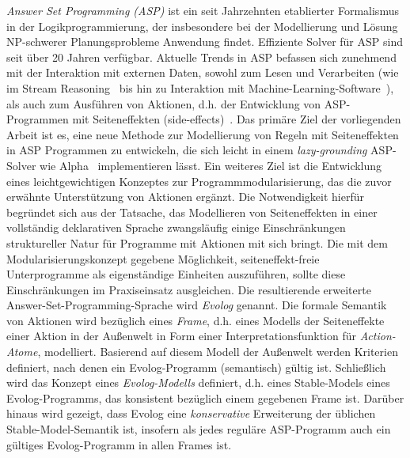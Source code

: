 \documentclass[draft,final]{vutinfth} %
\theoremstyle{definition}
\begin{document}
\frontmatter %

\addstatementpage

\begin{danksagung*}
\end{danksagung*}

\begin{acknowledgements*}
\end{acknowledgements*}

\begin{kurzfassung}
  \emph{Answer Set Programming (ASP)} ist ein seit Jahrzehnten etablierter Formalismus in der Logikprogrammierung, der insbesondere bei der Modellierung und Lösung NP-schwerer Planungsprobleme Anwendung findet. Effiziente Solver für ASP sind seit über 20 Jahren verfügbar. Aktuelle Trends in ASP befassen sich zunehmend mit der Interaktion mit externen Daten, sowohl zum Lesen und Verarbeiten (wie im Stream Reasoning~\cite{lars} bis hin zu Interaktion mit Machine-Learning-Software~\cite{neurasp}), als auch zum Ausführen von Aktionen, d.h. der Entwicklung von ASP-Programmen mit Seiteneffekten (side-effects)~\cite{acthex, aspetris}. Das primäre Ziel der vorliegenden Arbeit ist es, eine neue Methode zur Modellierung von Regeln mit Seiteneffekten in ASP Programmen zu entwickeln, die sich leicht in einem \emph{lazy-grounding} ASP-Solver wie Alpha~\cite{alpha} implementieren lässt. Ein weiteres Ziel ist die Entwicklung eines leichtgewichtigen Konzeptes zur Programmmodularisierung, das die zuvor erwähnte Unterstützung von Aktionen ergänzt. Die Notwendigkeit hierfür begründet sich aus der Tatsache, das Modellieren von Seiteneffekten in einer vollständig deklarativen Sprache zwangsläufig einige Einschränkungen struktureller Natur für Programme mit Aktionen mit sich bringt. Die mit dem Modularisierungskonzept gegebene Möglichkeit, seiteneffekt-freie Unterprogramme als eigenständige Einheiten auszuführen, sollte diese Einschränkungen im Praxiseinsatz ausgleichen. Die resultierende erweiterte Answer-Set-Programming-Sprache wird \emph{Evolog} genannt.
  Die formale Semantik von Aktionen wird bezüglich eines \emph{Frame}, d.h. eines Modells der Seiteneffekte einer Aktion in der Außenwelt in Form einer Interpretationsfunktion für \emph{Action-Atome}, modelliert. Basierend auf diesem Modell der Außenwelt werden Kriterien definiert, nach denen ein Evolog-Programm (semantisch) gültig ist. Schließlich wird das Konzept eines \emph{Evolog-Modells} definiert, d.h. eines Stable-Models eines Evolog-Programms, das konsistent bezüglich einem gegebenen Frame ist. Darüber hinaus wird gezeigt, dass Evolog eine \emph{konservative} Erweiterung der üblichen Stable-Model-Semantik ist, insofern als jedes reguläre ASP-Programm auch ein gültiges Evolog-Programm in allen Frames ist.

\end{kurzfassung}
\end{document}
